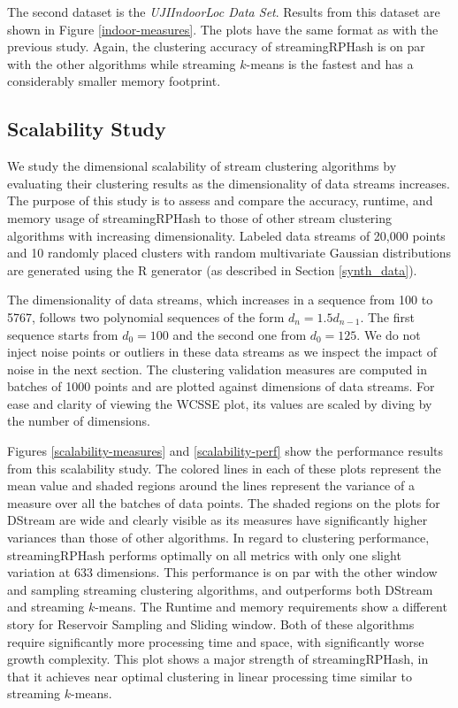 The second dataset is the \emph{UJIIndoorLoc Data Set}\cite{UJII}.  Results from this dataset
are shown in Figure \ref{indoor-measures}.  The plots have the same format as with the previous
study.  Again, the clustering accuracy of \textsf{streamingRPHash} is on par with the other
algorithms while streaming $k$-means is the fastest and has a considerably smaller memory footprint.

\subsection{Scalability Study}

We study the dimensional scalability of stream clustering algorithms by evaluating their clustering
results as the dimensionality of data streams increases.  The purpose of this study is to assess and
compare the accuracy, runtime, and memory usage of \textsf{streamingRPHash} to those of other stream
clustering algorithms with increasing dimensionality.  Labeled data streams of 20,000 points and 10
randomly placed clusters with random multivariate Gaussian distributions are generated using the R
generator (as described in Section \ref{synth_data}).

The dimensionality of data streams, which increases in a sequence from 100 to 5767, follows two
polynomial sequences of the form $d_n = 1.5d_{n-1}$.  The first sequence starts from $d_0 = 100$ and
the second one from $d_0 = 125$.  We do not inject noise points or outliers in these data streams as
we inspect the impact of noise in the next section.  The clustering validation measures are computed
in batches of 1000 points and are plotted against dimensions of data streams.  For ease and clarity
of viewing the WCSSE plot, its values are scaled by diving by the number of dimensions.

Figures \ref{scalability-measures} and \ref{scalability-perf} show the performance results from this
scalability study.  The colored lines in each of these plots represent the mean value and shaded
regions around the lines represent the variance of a measure over all the batches of data points.
The shaded regions on the plots for DStream are wide and clearly visible as its measures have
significantly higher variances than those of other algorithms. In regard to clustering performance, \textsf{streamingRPHash}
performs optimally on all metrics with only one slight variation at 633 dimensions.  This performance
is on par with the other window and sampling streaming clustering algorithms, and outperforms
both DStream and streaming $k$-means.  The Runtime and memory requirements show a different story 
for Reservoir Sampling and Sliding window. Both of these algorithms require significantly more
processing time and space, with significantly worse growth complexity.  This plot shows a major strength
of \textsf{streamingRPHash}, in that it achieves near optimal clustering in linear processing time similar
to streaming $k$-means.

